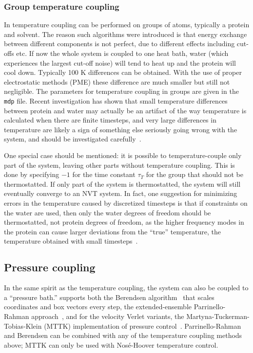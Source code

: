 
\subsubsection{Group temperature coupling}%
In {\gromacs} temperature coupling can be performed on groups of
atoms, typically a protein and solvent. The reason such algorithms
were introduced is that energy exchange between different components
is not perfect, due to different effects including cut-offs etc. If
now the whole system is coupled to one heat bath, water (which
experiences the largest cut-off noise) will tend to heat up and the
protein will cool down. Typically 100 K differences can be obtained.
With the use of proper electrostatic methods (PME) these difference
are much smaller but still not negligible.  The parameters for
temperature coupling in groups are given in the {\tt mdp} file.
Recent investigation has shown that small temperature differences
between protein and water may actually be an artifact of the way
temperature is calculated when there are finite timesteps, and very
large differences in temperature are likely a sign of something else
seriously going wrong with the system, and should be investigated
carefully~\cite{Eastwood2010}.

One special case should be mentioned: it is possible to temperature-couple only
part of the system, leaving other parts without temperature
coupling. This is done by specifying ${-1}$ for the time constant
$\tau_T$ for the group that should not be thermostatted.  If only
part of the system is thermostatted, the system will still eventually
converge to an NVT system.  In fact, one suggestion for minimizing
errors in the temperature caused by discretized timesteps is that if
constraints on the water are used, then only the water degrees of
freedom should be thermostatted, not protein degrees of freedom, as
the higher frequency modes in the protein can cause larger deviations
from the ``true'' temperature, the temperature obtained with small
timesteps~\cite{Eastwood2010}.

\subsection{Pressure coupling}
In the same spirit as the temperature coupling, the system can also be
coupled to a ``pressure bath.'' {\gromacs} supports both the Berendsen
algorithm~\cite{Berendsen84} that scales coordinates and box vectors
every step, the extended-ensemble Parrinello-Rahman approach~\cite{Parrinello81,Nose83}, and for
the velocity Verlet variants, the Martyna-Tuckerman-Tobias-Klein
(MTTK) implementation of pressure
control~\cite{Martyna1996}. Parrinello-Rahman and Berendsen can be
combined with any of the temperature coupling methods above; MTTK can
only be used with Nos{\'e}-Hoover temperature control.

